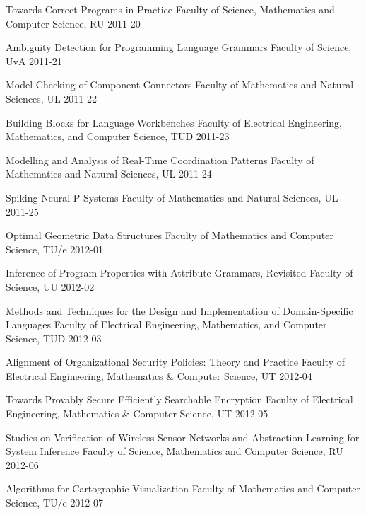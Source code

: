 \begin{multicols}{2}
         {Towards Correct Programs in Practice}
         {Faculty of Science, Mathematics and Computer Science, RU}
         {2011-20}

         {Ambiguity Detection for Programming Language Grammars}
         {Faculty of Science, UvA}
         {2011-21}

         {Model Checking of Component Connectors}
         {Faculty of Mathematics and Natural Sciences, UL}
         {2011-22}

         {Building Blocks for Language Workbenches}
         {Faculty of Electrical Engineering, Mathematics, and Computer Science, TUD}
         {2011-23}

         {Modelling and Analysis of Real-Time Coordination Patterns}
         {Faculty of Mathematics and Natural Sciences, UL}
         {2011-24}

         {Spiking Neural P Systems}
         {Faculty of Mathematics and Natural Sciences, UL}
         {2011-25}

         {Optimal Geometric Data Structures}
         {Faculty of Mathematics and Computer Science, TU/e}
         {2012-01}
         
         {Inference of Program Properties with Attribute Grammars, Revisited}
         {Faculty of Science, UU}
         {2012-02}

         {Methods and Techniques for the Design and Implementation of Domain-Specific Languages}
         {Faculty of Electrical Engineering, Mathematics, and Computer Science, TUD}
         {2012-03}

         {Alignment of Organizational Security Policies: Theory and Practice}
         {Faculty of Electrical Engineering, Mathematics \& Computer Science, UT}
         {2012-04}

         {Towards Provably Secure Efficiently Searchable Encryption} 
         {Faculty of Electrical Engineering, Mathematics \& Computer Science, UT}
         {2012-05}

         {Studies on Verification of Wireless Sensor Networks and Abstraction Learning for System Inference}
         {Faculty of Science, Mathematics and Computer Science, RU}
         {2012-06}

         {Algorithms for Cartographic Visualization}
         {Faculty of Mathematics and Computer Science, TU/e}
         {2012-07}


\end{multicols}
